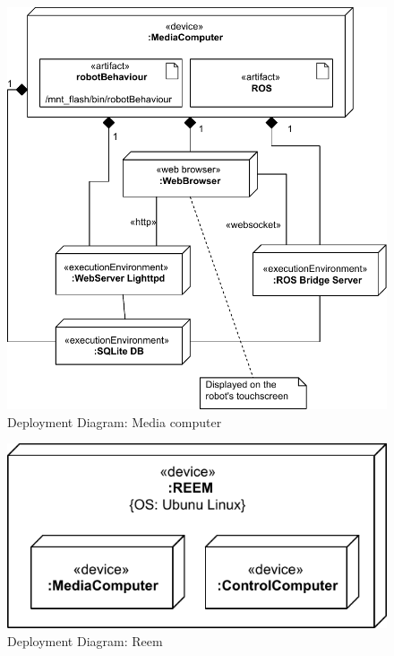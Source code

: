 \begin{figure}[htb]
    \centering
    \includegraphics{figures/design-deployment-mediacomputer.pdf}
    \caption{Deployment Diagram: Media computer}
    \label{fig:deploy-media}
\end{figure}

\begin{figure}[htb]
    \centering
    \includegraphics{figures/design-deployment-reem.pdf}
    \caption{Deployment Diagram: Reem}
    \label{fig:deploy-reem}
\end{figure}

